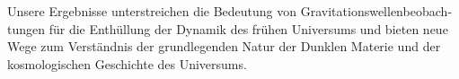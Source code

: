 \begin{otherlanguage}{ngerman}
Unsere Ergebnisse unterstreichen die Bedeutung von Gravitationswellenbeobachtungen für die Enthüllung der Dynamik des frühen Universums und bieten neue Wege zum Verständnis der grundlegenden Natur der Dunklen Materie und der kosmologischen Geschichte des Universums.



\end{otherlanguage}

\endgroup

\vfill
